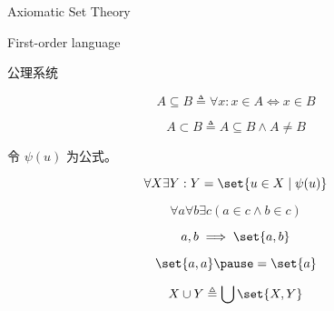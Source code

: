 \begin{frame}{}
  \centerline{\Large Axiomatic Set Theory}
\end{frame}

\begin{frame}{}
  First-order language
\end{frame}

\begin{frame}{}
  公理系统
\end{frame}

\begin{frame}{}
  \begin{definition}
  \end{definition}

  \[
    A \subseteq B \triangleq \forall x: x \in A \iff x \in B
  \]

  \[
    A \subset B \triangleq A \subseteq B \land A \neq B
  \]
\end{frame}

\begin{frame}{}
  \begin{definition}
    令 $\psi(u)$ 为公式。

    \[
      \forall X \exists Y: Y = \set{u \in X \mid \psi(u)}
    \]
  \end{definition}
\end{frame}

\begin{frame}{}
  \begin{definition}[``$\cap$'']
  \end{definition}

  \begin{definition}[``$\setminus$'']
  \end{definition}
\end{frame}

\begin{frame}{}
  \begin{definition}
    \[
      \forall a \forall b \exists c (a \in c \land b \in c)
    \]

    \[
      a, b \implies \set{a, b}
    \]
  \end{definition}

  \[
    \set{a, a} \pause = \set{a}
  \]

  \pause
  \begin{definition}
  \end{definition}

  \[
    X \cup Y \triangleq \bigcup \set{X, Y}
  \]
\end{frame}

